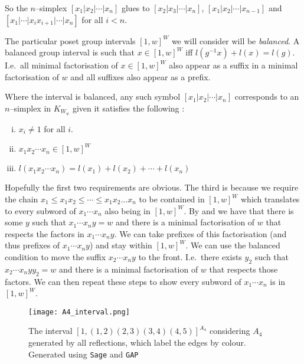 \documentclass[class=article, crop=false]{standalone}
\begin{document}
So the $n$--simplex $[x_1 | x_2 | \cdots | x_n]$ glues to $[x_2|x_3|\cdots|x_n]$, $[x_1|x_2|\cdots|x_{n-1}]$ and $[x_1| \cdots | x_ix_{i+1} | \cdots |x_n]$ for all $i<n$.

The particular poset group intervals $[1,w]^W$ we will consider will be \emph{balanced}. A balanced group interval is such that  $x \in [1,w]^W$ iff $l(g^{-1}x) + l(x) = l(g)$. I.e.~all minimal factorisation of $x \in [1,w]^W$ also appear as a suffix in a minimal factorisation of $w$ and all suffixes also appear as a prefix.

Where the interval is balanced, any such symbol  $[x_1 | x_2 | \cdots | x_n]$ corresponds to an $n$--simplex in $K_{W_w}$ given it satisfies the following \cite[Definition 2.8]{paolini_salvetti_kpi1_2021}:
\begin{enumerate}[i)]
    \item \label{item:interval_complex_requirement_1} $x_i \neq 1$ for all $i$.
    \item \label{item:interval_complex_requirement_2} $x_1 x_2 \cdots x_n \in [1,w]^W$
    \item \label{item:interval_complex_requirement_3} $l(x_1x_2\cdots x_n) = l(x_1) + l(x_2) + \cdots + l(x_n)$ 
\end{enumerate}

Hopefully the first two requirements are obvious. The third is because we require the chain $x_1 \leq x_1x_2 \leq \cdots \leq x_1x_2\ldots x_{n}$ to be contained in $[1,w]^W$ which translates to every subword of $x_1\cdots x_n$ also being in $[1,w]^W$. By  and  we have that there is some $y$ such that $x_1 \cdots x_n y = w$ and there is a minimal factorisation of $w$ that respects the factors in $ x_1 \cdots x_n y$. We can take prefixes of this factorisation (and thus prefixes of $ x_1 \cdots x_n y$) and stay within $[1,w]^W$. We can use the balanced condition to move the suffix $x_2\cdots x_n y$ to the front. I.e.~there exists $y_2$ such that $x_2\cdots x_n yy_2=w$ and there is a minimal factorisation of $w$ that respects those factors. We can then repeat these steps to show every subword of $x_1 \cdots x_n $ is in $[1,w]^W$.

\begin{figure}
	\centering
	\texttt{[image: A4\_interval.png]}
	\caption{The interval $[1, (1,2)(2,3)(3,4)(4,5)]^{A_4}$ considering $A_4$ generated by all reflections, which label the edges by colour. Generated using \texttt{Sage} and \texttt{GAP} \cite{sagemath_2020, gap_2022}}
	\label{fig:A4_interval}
\end{figure}
\end{document}

